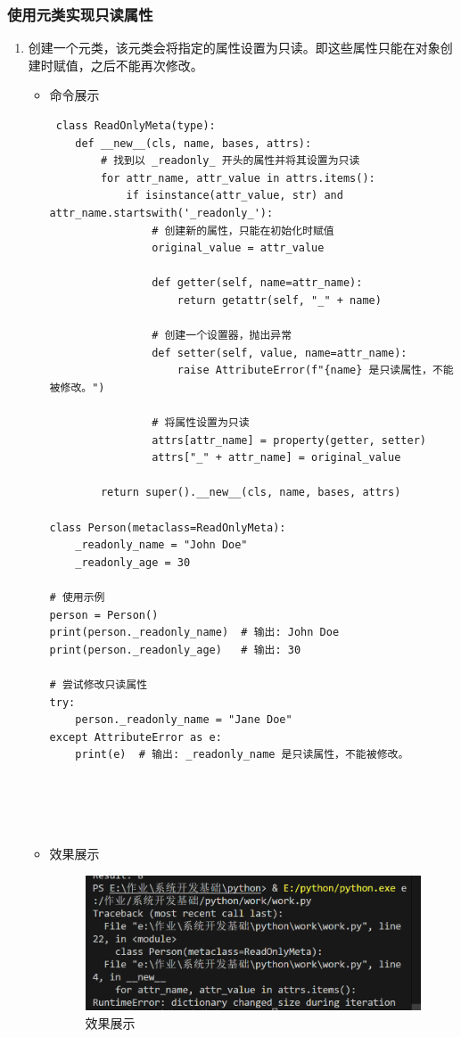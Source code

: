 \documentclass[UTF8]{ctexart}
\begin{document}
\subsubsection{使用元类实现只读属性}

\begin{enumerate}
  \item 创建一个元类，该元类会将指定的属性设置为只读。即这些属性只能在对象创建时赋值，之后不能再次修改。
  \begin{itemize}
  \item 命令展示
  \begin{verbatim}
 class ReadOnlyMeta(type):
    def __new__(cls, name, bases, attrs):
        # 找到以 _readonly_ 开头的属性并将其设置为只读
        for attr_name, attr_value in attrs.items():
            if isinstance(attr_value, str) and attr_name.startswith('_readonly_'):
                # 创建新的属性，只能在初始化时赋值
                original_value = attr_value

                def getter(self, name=attr_name):
                    return getattr(self, "_" + name)

                # 创建一个设置器，抛出异常
                def setter(self, value, name=attr_name):
                    raise AttributeError(f"{name} 是只读属性，不能被修改。")

                # 将属性设置为只读
                attrs[attr_name] = property(getter, setter)
                attrs["_" + attr_name] = original_value

        return super().__new__(cls, name, bases, attrs)

class Person(metaclass=ReadOnlyMeta):
    _readonly_name = "John Doe"
    _readonly_age = 30

# 使用示例
person = Person()
print(person._readonly_name)  # 输出: John Doe
print(person._readonly_age)   # 输出: 30

# 尝试修改只读属性
try:
    person._readonly_name = "Jane Doe"
except AttributeError as e:
    print(e)  # 输出: _readonly_name 是只读属性，不能被修改。



    
  \end{verbatim}

  \item 效果展示
  \begin{figure}[H]
    \centering
    \includegraphics[width=\textwidth]{26} %
    \caption{效果展示}
  
  \end{figure}
\end{itemize}
\end{enumerate}
\end{document}

